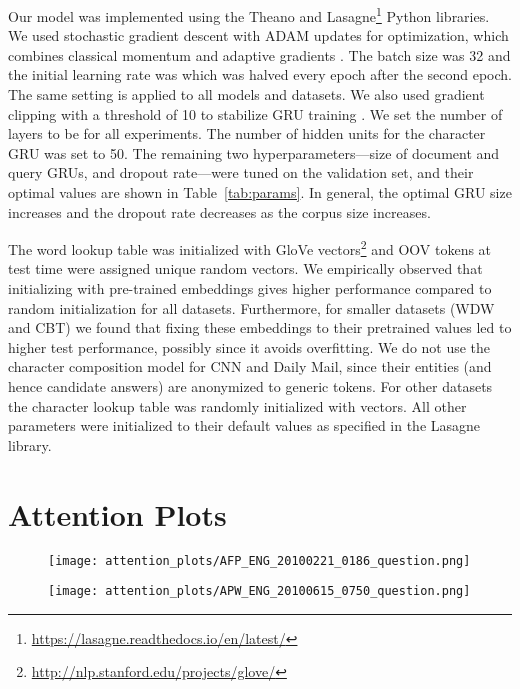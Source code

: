 \documentclass[11pt,a4paper]{article}
\begin{document}
Our model was implemented using the Theano \citep{2016arXiv160502688short} and Lasagne\footnote{\scriptsize \url{https://lasagne.readthedocs.io/en/latest/}} Python libraries. We used stochastic gradient descent with ADAM updates for optimization, which combines classical momentum and adaptive gradients \citep{kingma2014adam}. The batch size was 32 and the initial learning rate was  which was halved every epoch after the second epoch.
The same setting is applied to all models and datasets. We also used gradient clipping with a threshold of 10 to stabilize GRU training \citep{pascanu2012difficulty}.
We set the number of layers  to be  for all experiments.
The number of hidden units for the character GRU was set to 50.
The remaining two hyperparameters---size of document and query GRUs, and dropout rate---were tuned on the validation set, and their optimal values are shown in Table~\ref{tab:params}. In general, the optimal GRU size increases and the dropout rate decreases as the corpus size increases.

The word lookup table was initialized with  GloVe vectors\footnote{\scriptsize \url{http://nlp.stanford.edu/projects/glove/}} \citep{pennington2014glove} and OOV tokens at test time were assigned unique random vectors. We empirically observed that initializing with pre-trained embeddings gives higher performance compared to random initialization for all datasets. Furthermore, for smaller datasets (WDW and CBT) we found that fixing these embeddings to their pretrained values led to higher test performance, possibly since it avoids overfitting. We do not use the character composition model for CNN and Daily Mail, since their entities (and hence candidate answers) are anonymized to generic tokens. For other datasets the character lookup table was randomly initialized with  vectors. All other parameters were initialized to their default values as specified in the Lasagne library.


\section{Attention Plots}
\begin{figure*}[h]
\centering
\caption{Layer-wise attention visualization of GA Reader trained on WDW-Strict. See text for details.}
\begin{subfigure}[b]{\textwidth}
\centering
\texttt{[image: attention\_plots/AFP\_ENG\_20100221\_0186\_question.png]}
\end{subfigure}
\begin{subfigure}[b]{\textwidth}
\centering
\texttt{[image: attention\_plots/APW\_ENG\_20100615\_0750\_question.png]}
\end{subfigure}
\end{figure*}
\end{document}
